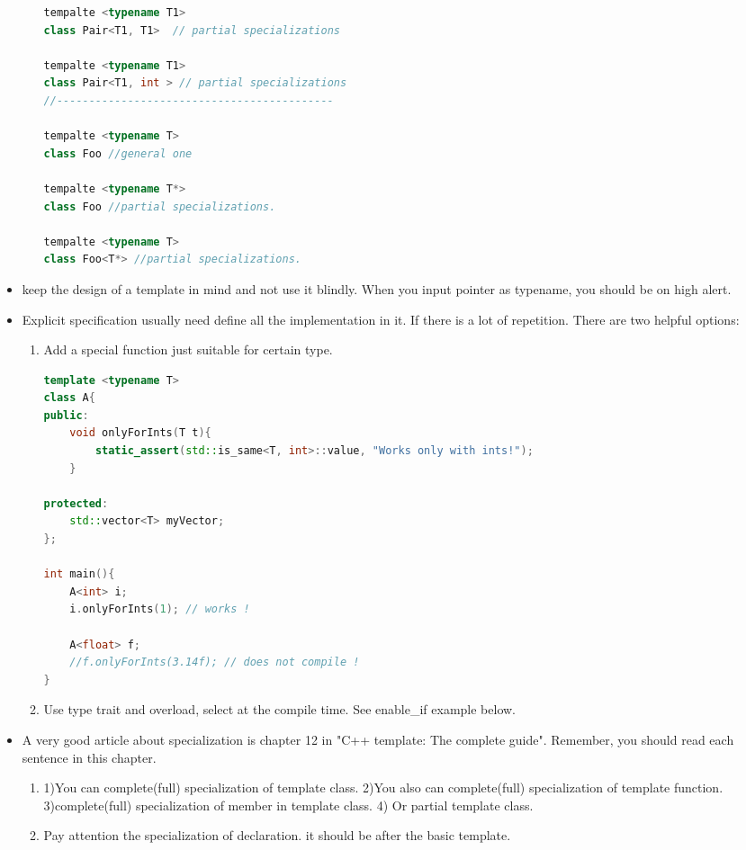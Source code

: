 \documentclass[a4paper,12pt,twoside]{book}
\begin{document}
\begin{itemize}
\begin{enumerate}
\begin{lstlisting}[frame=single, language=c++]
tempalte <typename T1>
class Pair<T1, T1>  // partial specializations

tempalte <typename T1>
class Pair<T1, int > // partial specializations
//-------------------------------------------

tempalte <typename T>
class Foo //general one

tempalte <typename T*>
class Foo //partial specializations.

tempalte <typename T>
class Foo<T*> //partial specializations.
\end{lstlisting}

\end{enumerate}

\item keep the design of a template in mind and not use it blindly. When you input pointer as typename, you should be on high alert.


\item Explicit specification usually need define all the implementation in it. If there is a lot of repetition. There are two helpful options: 
\begin{enumerate}
\item Add a special function just suitable for certain type. 
\begin{lstlisting}[frame=single, language=c++]
template <typename T>
class A{
public:
    void onlyForInts(T t){
        static_assert(std::is_same<T, int>::value, "Works only with ints!");
    }

protected:
    std::vector<T> myVector;
};

int main(){
    A<int> i;
    i.onlyForInts(1); // works !

    A<float> f;
    //f.onlyForInts(3.14f); // does not compile !
}
\end{lstlisting}

\item Use type trait and overload, select at the compile time. See enable\_if example below.

\end{enumerate}

\item A very good article about specialization is chapter 12 in "C++ template: The complete guide". Remember, you should read each sentence in this chapter.
\begin{enumerate}
	\item 1)You can complete(full) specialization of template class. 2)You also can complete(full) specialization of template function. 3)complete(full) specialization of member in template class. 4) Or partial template class.
	\item Pay attention the specialization of declaration. it should be after the basic template.
	
\end{enumerate}

\end{itemize}
\end{document}
